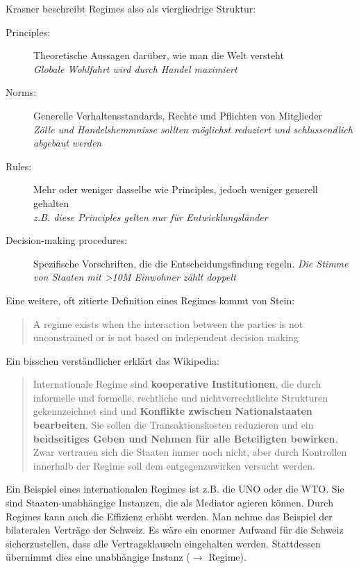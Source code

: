 \documentclass[a4paper, 11pt]{article}
\begin{document}
\noindent Krasner beschreibt Regimes also als viergliedrige Struktur:

\begin{description}
    \item[Principles: ] Theoretische Aussagen darüber, wie man die Welt versteht \\
    \textit{Globale Wohlfahrt wird durch Handel maximiert}
    \item[Norms: ] Generelle Verhaltensstandards, Rechte und Pflichten von Mitglieder \\
    \textit{Zölle und Handelshemmnisse sollten möglichst reduziert und schlussendlich abgebaut werden}
    \item[Rules:] Mehr oder weniger dasselbe wie Principles, jedoch weniger generell gehalten \\
    \textit{z.B. diese Principles gelten nur für Entwicklungsländer}
    \item[Decision-making procedures: ] Spezifische Vorschriften, die die Entscheidungsfindung regeln. 
    \textit{Die Stimme von Staaten mit >10M Einwohner zählt doppelt}
\end{description}

\noindent Eine weitere, oft zitierte Definition eines Regimes kommt von Stein:
\begin{quote}
    \begin{blockquote}[Stein 1982]{A regime exists when the interaction between the parties is not unconstrained or is not based on independent decision making}
    \end{blockquote}
\end{quote}

\noindent Ein bisschen verständlicher erklärt das Wikipedia: 
\begin{quote}
    \begin{blockquote}[Wikipedia]{Internationale Regime sind \textbf{kooperative Institutionen}, die durch informelle und formelle, rechtliche und nichtverrechtlichte Strukturen gekennzeichnet sind und \textbf{Konflikte zwischen Nationalstaaten bearbeiten}. Sie sollen die Transaktionskosten reduzieren und ein \textbf{beidseitiges Geben und Nehmen für alle Beteiligten bewirken}. Zwar vertrauen sich die Staaten immer noch nicht, aber durch Kontrollen innerhalb der Regime soll dem entgegenzuwirken versucht werden.}
    \end{blockquote}
\end{quote}
Ein Beispiel eines internationalen Regimes ist z.B. die UNO oder die WTO. Sie sind Staaten-unabhängige Instanzen, die als Mediator agieren können. Durch Regimes kann auch die Effizienz erhöht werden. Man nehme das Beispiel der bilateralen Verträge der Schweiz. Es wäre ein enormer Aufwand für die Schweiz sicherzustellen, dass alle Vertragsklauseln eingehalten werden. Stattdessen übernimmt dies eine unabhängige Instanz ($\rightarrow$ Regime).  
\end{document}
